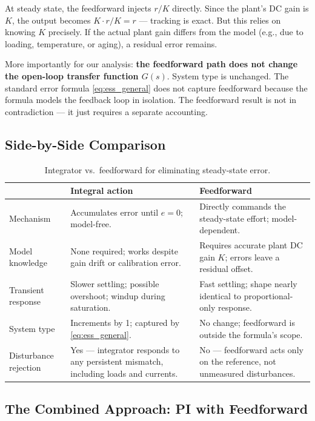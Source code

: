 \documentclass[12pt]{article}
\begin{document}
At steady state, the feedforward injects $r/K$ directly.  Since the plant's
DC gain is $K$, the output becomes $K \cdot r/K = r$ --- tracking is exact.
But this relies on knowing $K$ precisely.  If the actual plant gain differs
from the model (e.g., due to loading, temperature, or aging), a residual
error remains.

More importantly for our analysis: \textbf{the feedforward path does not
change the open-loop transfer function $G(s)$}.  System type is unchanged.
The standard error formula \cref{eq:ess_general} does not capture feedforward
because the formula models the feedback loop in isolation.  The feedforward
result is not in contradiction --- it just requires a separate accounting.

\subsection{Side-by-Side Comparison}

\begin{table}[htbp]
\centering
\caption{Integrator vs.\ feedforward for eliminating steady-state error.}
\label{tab:int_vs_ff}
\begin{tabular}{p{2.4cm}p{5.0cm}p{5.0cm}}
\toprule
 & \textbf{Integral action} & \textbf{Feedforward} \\
\midrule
Mechanism
  & Accumulates error until $e = 0$; model-free.
  & Directly commands the steady-state effort; model-dependent. \\[4pt]
Model knowledge
  & None required; works despite gain drift or calibration error.
  & Requires accurate plant DC gain $K$; errors leave a residual offset. \\[4pt]
Transient response
  & Slower settling; possible overshoot; windup during saturation.
  & Fast settling; shape nearly identical to proportional-only response. \\[4pt]
System type
  & Increments by 1; captured by \cref{eq:ess_general}.
  & No change; feedforward is outside the formula's scope. \\[4pt]
Disturbance rejection
  & Yes --- integrator responds to any persistent mismatch, including loads and currents.
  & No --- feedforward acts only on the reference, not unmeasured disturbances. \\[4pt]
\bottomrule
\end{tabular}
\end{table}

\subsection{The Combined Approach: PI with Feedforward}
\end{document}
